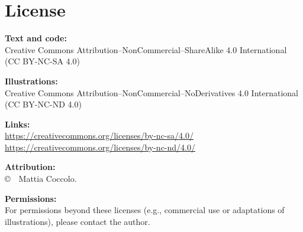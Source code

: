 \chapter*{License}

\noindent\textbf{Text and code:}\\
Creative Commons Attribution--NonCommercial--ShareAlike 4.0 International (CC BY-NC-SA 4.0)

\vspace{0.8em}

\noindent\textbf{Illustrations:}\\
Creative Commons Attribution--NonCommercial--NoDerivatives 4.0 International (CC BY-NC-ND 4.0)

\vspace{1.0em}

\noindent\textbf{Links:}\\
\url{https://creativecommons.org/licenses/by-nc-sa/4.0/}\\
\url{https://creativecommons.org/licenses/by-nc-nd/4.0/}

\vspace{1.0em}

\noindent\textbf{Attribution:}\\
\copyright\ \the\year\ Mattia Coccolo.

\vspace{0.6em}

\noindent\textbf{Permissions:}\\
For permissions beyond these licenses (e.g., commercial use or adaptations of illustrations), please contact the author.